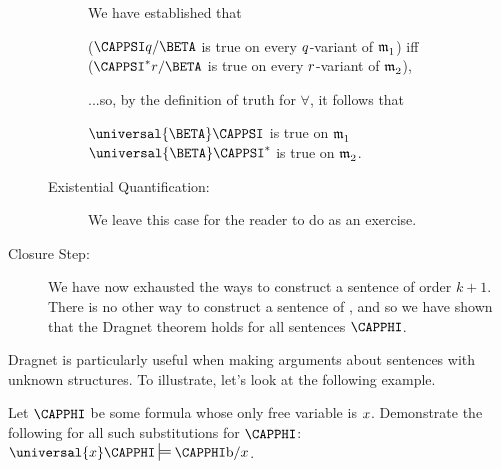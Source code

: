 \begin{PROOF}
\begin{description}
\begin{description}
\begin{SUBPROOF}
\end{SUBPROOF}

We have established that
\begin{center}
	($\CAPPSI\variable{q}/\BETA$ is true on every $q$-variant of $\mathfrak{m^{\mathrm{}}_{\mathrm{1}}}$) iff\\
	($\CAPPSI^*\variable{r}/\BETA$ is true on every $r$-variant of $\mathfrak{m^{\mathrm{}}_{\mathrm{2}}}$),
\end{center}
...so, by the definition of truth for $\forall$, it follows that
\begin{center}
	$\universal{\BETA}\CAPPSI$ is true on $\mathfrak{m^{\mathrm{}}_{\mathrm{1}}}$ \Iff $\universal{\BETA}\CAPPSI^*$ is true on $\mathfrak{m^{\mathrm{}}_{\mathrm{2}}}$.
\end{center}

\item[Existential Quantification:] We leave this case for the reader to do as an exercise.
\end{description}
\item[Closure Step:] We have now exhausted the ways to construct a sentence of order $k+1$.  There is no other way to construct a sentence of \GQL{}, and so we have shown that the Dragnet theorem holds for all sentences $\CAPPHI$.
\end{description}
\end{PROOF}

Dragnet is particularly useful when making arguments about sentences with unknown structures.  To illustrate, let's look at the following example.

\begin{majorILnc}{}
 Let $\CAPPHI$ be some formula whose only free variable is $x$.  Demonstrate the following for all such substitutions for $\CAPPHI$: $\universal{\variable{x}}\CAPPHI\sdtstile{}{}\CAPPHI\constant{b}/\variable{x}$.  
\end{majorILnc} 
 
